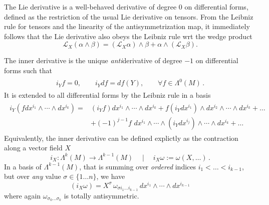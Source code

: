 \documentclass[../geometry_main.tex]{subfiles}
\begin{document}
\begin{mytheorem}
The Lie derivative is a well-behaved derivative of degree 0 on differential forms, defined as the restriction of the usual Lie derivative on tensors.
From the Leibniz rule for tensors and the linearity of the antisymmetrization map, it immediately follows that the Lie derivative also obeys the Leibniz rule wrt the wedge product
\begin{equation}
    \mathcal{L}_X(\alpha \wedge \beta) = (\mathcal{L}_X \alpha) \wedge \beta + \alpha \wedge (\mathcal{L}_X \beta).
\end{equation}
\end{mytheorem}


\begin{mytheorem}
The inner derivative is the unique \emph{anti}derivative of degree $-1$ on differential forms such that
{\small\begin{align}
\begin{aligned}
    i_Y f = 0, \qquad    i_Y df = df(Y), \qquad \forall f\in \Lambda^0(M)\,.
\end{aligned}
\end{align}}
It is extended to all differential forms by the Leibniz rule in a basis
{\small\begin{align}\begin{aligned}
    i_Y(f dx^{i_1} \wedge \cdots \wedge dx^{i_k}) = & (i_Y f) dx^{i_1} \wedge \cdots \wedge dx^{i_k} 
    + f (i_Y dx^{i_1}) \wedge dx^{i_2} \wedge \cdots \wedge dx^{i_k} + \dots
    \\
    &+(-1)^{j-1} f \,\,dx^{i_1} \wedge \cdots \wedge (i_Y dx^{i_j}) \wedge \cdots \wedge dx^{i_k} +\dots
\end{aligned}
\end{align}}
Equivalently, the inner derivative can be defined explictly as the contraction along a vector field $X$
\begin{equation}
    i_X: \Lambda^k (M) \to \Lambda^{k-1} (M)\quad  \mid\quad  i_X \omega := \omega (X, \dots)\,.
\end{equation}
In a basis of $\Lambda^{k-1}(M)$, that is summing over \emph{ordered} indices $i_1< \dots <i_{k-1}$, but over \emph{any} value $\sigma\in \{1\dots n\}$, we have
\begin{equation}\label{eq:interior_derivative_basis_expr}
   (i_X \omega) = X^{\sigma}\, \omega_{\sigma i_1 \dots i_{k-1}} \, dx^{i_1} \wedge \cdots \wedge dx^{i_{k-1}}
\end{equation} 
where again $\omega_{\sigma_0 \dots \sigma_k}$ is totally antisymmetric.

\end{mytheorem}
\end{document}
